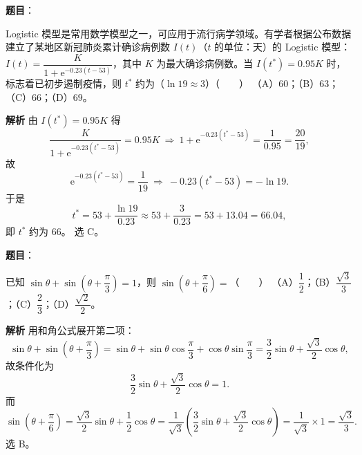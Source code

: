 \begin{answer}

\textbf{题目}：

Logistic 模型是常用数学模型之一，可应用于流行病学领域。有学者根据公布数据建立了某地区新冠肺炎累计确诊病例数 $I(t)$（$t$ 的单位：天）的 Logistic 模型：$I(t)=\dfrac K{1+\mathrm e^{-0.23(t-53)}}$，其中 $K$ 为最大确诊病例数。当 $I(t^*)=0.95K$ 时，标志着已初步遏制疫情，则 $t^*$ 约为（$\ln19\approx3$）\mbox{（　　）}
（A）$60$；（B）$63$；（C）$66$；（D）$69$。

\textbf{解析}
由 $I(t^*)=0.95K$ 得
\nopagebreak[4]
\[\frac K{1+\mathrm e^{-0.23(t^*-53)}}=0.95K\ \Longrightarrow\ 1+\mathrm e^{-0.23(t^*-53)}=\frac1{0.95}=\frac{20}{19},\]
故
\nopagebreak[4]
\[\mathrm e^{-0.23(t^*-53)}=\frac1{19}\ \Longrightarrow\ -0.23(t^*-53)=-\ln19 .\]
于是
\nopagebreak[4]
\[t^*=53+\frac{\ln19}{0.23}\approx53+\frac3{0.23}=53+13.04=66.04,\]
即 $t^*$ 约为 $66$。
选 C。


\end{answer}
\begin{answer}

\textbf{题目}：

已知 $\sin\theta+\sin\left(\theta+\dfrac\pi3\right)=1$，则 $\sin\left(\theta+\dfrac\pi6\right)=$\mbox{（　　）}
（A）$\dfrac12$；（B）$\dfrac{\sqrt3}3$；（C）$\dfrac23$；（D）$\dfrac{\sqrt2}2$。

\textbf{解析}
用和角公式展开第二项：
\nopagebreak[4]
\[\sin\theta+\sin\left(\theta+\frac\pi3\right)=\sin\theta+\sin\theta\cos\frac\pi3+\cos\theta\sin\frac\pi3=\frac32\sin\theta+\frac{\sqrt3}2\cos\theta,\]
故条件化为
\nopagebreak[4]
\[\frac32\sin\theta+\frac{\sqrt3}2\cos\theta=1 .\]
而
\nopagebreak[4]
\[\sin\left(\theta+\frac\pi6\right)=\frac{\sqrt3}2\sin\theta+\frac12\cos\theta=\frac1{\sqrt3}\left(\frac32\sin\theta+\frac{\sqrt3}2\cos\theta\right)=\frac1{\sqrt3}\times1=\frac{\sqrt3}3 .\]
选 B。


\end{answer}
